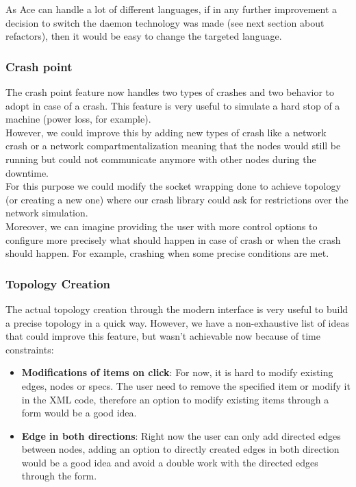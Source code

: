 \documentclass{eplmastersthesis}
\begin{document}
        As Ace can handle a lot of different languages, if in any further
        improvement a decision to switch the daemon technology was made (see
        next section about refactors), then it would be easy to change the
        targeted language.

        \subsubsection{Crash point}

          The crash point feature now handles two types of crashes and two
          behavior to adopt in case of a crash. This feature is very useful
          to simulate a hard stop of a machine (power loss, for example).\\
          However, we could improve this by adding new types of crash like a
          network crash or a network compartmentalization meaning that the
          nodes would still be running but could not communicate anymore
          with other nodes during the downtime.\\
          For this purpose we could modify the socket wrapping done to achieve
          topology (or creating a new one) where our crash library could ask
          for restrictions over the network simulation.\\

          Moreover, we can imagine providing the user with more control options
          to configure more precisely what should happen in case of crash or
          when the crash should happen. For example, crashing when some
          precise conditions are met.

        \subsubsection{Topology Creation}

          The actual topology creation through the modern interface is very
          useful to build a precise topology in a quick way. However, we have
          a non-exhaustive list of ideas that could improve this feature, but
          wasn't achievable now because of time constraints:

          \begin{itemize}
            \item \textbf{Modifications of items on click}: For now, it is hard
            to modify existing edges, nodes or specs. The user need to remove
            the specified item or modify it in the XML code, therefore
            an option to modify existing items through a form would be a good
            idea.
            \item \textbf{Edge in both directions}: Right now the user can only
            add directed edges between nodes, adding an option to directly
            created edges in both direction would be a good idea and
            avoid a double work with the directed edges through the form.
          \end{itemize}
\end{document}
